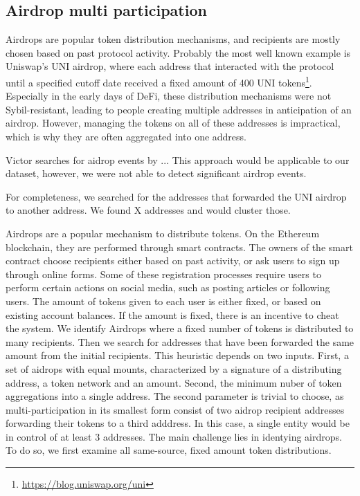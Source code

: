 \documentclass[12pt,a4paper,titlepage,oneside,english]{article}
\begin{document}
\subsection{Airdrop multi participation}
Airdrops are popular token distribution mechanisms, and recipients are mostly chosen based on past protocol activity. Probably the most well known example is Uniswap's UNI airdrop, where each address that interacted with the protocol until a specified cutoff date received a fixed amount of 400 UNI tokens\footnote{\url{https://blog.uniswap.org/uni}}. Especially in the early days of DeFi, these distribution mechanisms were not Sybil-resistant, leading to people creating multiple addresses in anticipation of an airdrop. However, managing the tokens on all of these addresses is impractical, which is why they are often aggregated into one address. \citep{FV:17} 

Victor searches for aidrop events by ... This approach would be applicable to our dataset, however, we were not able to detect significant airdrop events.  

For completeness, we searched for the addresses that forwarded the UNI airdrop to another address. We found X addresses and would cluster those.

\iffalse
Airdrops are a popular mechanism to distribute tokens. On the Ethereum blockchain, they are performed through smart contracts. The owners of the smart contract choose recipients either based on past activity, or ask users to sign up through online forms. Some of these registration processes require users to perform certain actions on social media, such as posting articles or following users. The amount of tokens given to each user is either fixed, or based on existing account balances. If the amount is fixed, there is an incentive to cheat the system. 
We identify Airdrops where a fixed number of tokens is distributed to many recipients. Then we search for addresses that have been forwarded the same amount from the initial recipients. 
This heuristic depends on two inputs. First, a set of aidrops with equal mounts, characterized by a signature of a distributing address, a token network and an amount. Second, the minimum nuber of token aggregations into a single address. The second parameter is trivial to choose, as multi-participation in its smallest form consist of two aidrop recipient addresses forwarding their tokens to a third adddress. In this case, a single entity would be in control of at least 3 addresses.
The main challenge lies in identying airdrops. To do so, we first examine all same-source, fixed amount token distributions.
\end{document}
